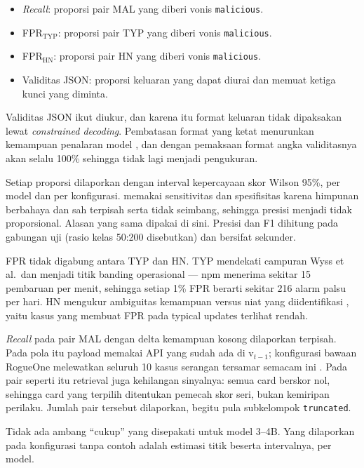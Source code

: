 \documentclass[a4paper,fleqn]{cas-dc}
\begin{document}
\begin{itemize}
\item \emph{Recall}: proporsi pair MAL yang diberi vonis \texttt{malicious}.
\item FPR$_{\mathrm{TYP}}$: proporsi pair TYP yang diberi vonis \texttt{malicious}.
\item FPR$_{\mathrm{HN}}$: proporsi pair HN yang diberi vonis \texttt{malicious}.
\item Validitas JSON: proporsi keluaran yang dapat diurai dan memuat ketiga
kunci yang diminta.
\end{itemize}

Validitas JSON ikut diukur, dan karena itu format keluaran tidak dipaksakan
lewat \emph{constrained decoding}. Pembatasan format yang ketat menurunkan
kemampuan penalaran model \citep{tam2024speak}, dan dengan pemaksaan format
angka validitasnya akan selalu 100\% sehingga tidak lagi menjadi pengukuran.

Setiap proporsi dilaporkan dengan interval kepercayaan skor Wilson 95\%, per
model dan per konfigurasi. \citet{wyss2025evaluating} memakai sensitivitas dan
spesifisitas karena himpunan berbahaya dan sah terpisah serta tidak seimbang,
sehingga presisi menjadi tidak proporsional. Alasan yang sama dipakai di sini.
Presisi dan F1 dihitung pada gabungan uji (rasio kelas 50:200 disebutkan) dan
bersifat sekunder.

FPR tidak digabung antara TYP dan HN. TYP mendekati campuran Wyss et al.\ dan
menjadi titik banding operasional --- npm menerima sekitar 15 pembaruan per
menit, sehingga setiap 1\% FPR berarti sekitar 216 alarm palsu per hari.
HN mengukur ambiguitas kemampuan versus niat yang diidentifikasi
\citet{guo2026effective}, yaitu kasus yang membuat FPR pada typical updates
terlihat rendah.

\emph{Recall} pada pair MAL dengan delta kemampuan kosong dilaporkan terpisah.
Pada pola itu payload memakai API yang sudah ada di $\mathrm{v}_{t-1}$;
konfigurasi bawaan RogueOne melewatkan seluruh 10 kasus serangan tersamar
semacam ini \citep{sofaer2024rogueone}. Pada pair seperti itu retrieval juga
kehilangan sinyalnya: semua card berskor nol, sehingga card yang terpilih
ditentukan pemecah skor seri, bukan kemiripan perilaku. Jumlah pair tersebut
dilaporkan, begitu pula subkelompok \texttt{truncated}.

Tidak ada ambang ``cukup'' yang disepakati untuk model 3--4B. Yang dilaporkan
pada konfigurasi tanpa contoh adalah estimasi titik beserta intervalnya, per
model.
\end{document}
